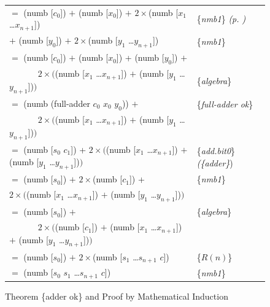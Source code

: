 \begin{figure}
\begin{center}
\begin{tabular}{ll}
$=$ (numb [$c_0$]) $+$ (numb [$x_0$]) $+$ $2\times$(numb [$x_1$ \dots $x_{n+1}$])                         & \{\emph{nmb1}\} \emph{(p. \pageref{nmb1})} \\
\hphantom{$=$ (numb [$c_0$]) }$+$ (numb [$y_0$]) $+$ $2\times$(numb [$y_1$ \dots $y_{n+1}$])                  & \{\emph{nmb1}\} \\
$=$ (numb [$c_0$]) $+$ (numb [$x_0$]) + (numb [$y_0$]) $+$                                                & \\
 ~~~~~~ $2\times($(numb [$x_1$ \dots $x_{n+1}$]) $+$ (numb [$y_1$ \dots $y_{n+1}$])$)$                    & \{\emph{algebra}\} \\
$=$ (numb (full-adder $c_0$ $x_0$ $y_0$)) $+$                                                             & \{\emph{full-adder ok}\} \\
 ~~~~~~ $2\times($(numb [$x_1$ \dots $x_{n+1}$]) $+$ (numb [$y_1$ \dots $y_{n+1}$])$)$                    & \\
$=$ (numb [$s_0$ $c_1$]) + $2\times($(numb [$x_1$ \dots $x_{n+1}$]) $+$ (numb [$y_1$ \dots $y_{n+1}$])$)$ & \{\emph{add.bit0}\} \emph{(\{adder\}}) \\
$=$ (numb [$s_0$]) $+$ $2\times$(numb [$c_1$]) +                                                          & \{\emph{nmb1}\} \\
\hphantom{$=$ (numb [$s_0$ $c_1$]) + }$2\times($(numb [$x_1$ \dots $x_{n+1}$]) $+$ (numb [$y_1$ \dots $y_{n+1}$])$)$  & \\
$=$ (numb [$s_0$]) $+$                                                                                    & \{\emph{algebra}\} \\
 ~~~~~~ $2\times($(numb [$c_1$]) $+$ (numb [$x_1$ \dots $x_{n+1}$]) $+$ (numb [$y_1$ \dots $y_{n+1}$])$)$ & \\
$=$ (numb [$s_0$]) $+$ $2\times$(numb [$s_1$ \dots $s_{n+1}$ $c$])                                        & \{$R(n)$\} \\
$=$ (numb [$s_0$ $s_1$ \dots $s_{n+1}$ $c$])                                                              & \{\emph{nmb1}\} \\
\end{tabular}
\end{center}
\caption{Theorem \{adder ok\} and Proof by Mathematical Induction}
\label{fig:adder-thm-prf}
\end{figure}

